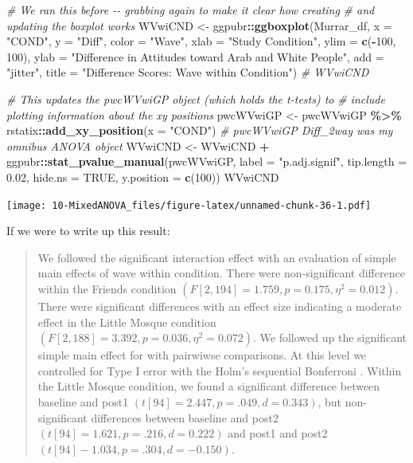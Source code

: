 \documentclass[
  11pt,
]{book}
\newenvironment{Shaded}{\begin{snugshade}}{\end{snugshade}}
\newcommand{\AttributeTok}[1]{\textcolor[rgb]{0.27,0.27,0.27}{#1}}
\newcommand{\CommentTok}[1]{\textcolor[rgb]{0.37,0.37,0.37}{\textit{#1}}}
\newcommand{\ConstantTok}[1]{\textcolor[rgb]{0.37,0.37,0.37}{#1}}
\newcommand{\DecValTok}[1]{\textcolor[rgb]{0.06,0.06,0.06}{#1}}
\newcommand{\FloatTok}[1]{\textcolor[rgb]{0.06,0.06,0.06}{#1}}
\newcommand{\FunctionTok}[1]{\textcolor[rgb]{0.27,0.27,0.27}{\textbf{#1}}}
\newcommand{\NormalTok}[1]{#1}
\newcommand{\OtherTok}[1]{\textcolor[rgb]{0.37,0.37,0.37}{#1}}
\newcommand{\SpecialCharTok}[1]{\textcolor[rgb]{0.43,0.43,0.43}{\textbf{#1}}}
\newcommand{\StringTok}[1]{\textcolor[rgb]{0.5,0.5,0.5}{#1}}
\begin{document}
\begin{Shaded}
\begin{Highlighting}[]
\CommentTok{\# We ran this before {-}{-} grabbing again to make it clear how creating}
\CommentTok{\# and updating the boxplot works}
\NormalTok{WVwiCND }\OtherTok{\textless{}{-}}\NormalTok{ ggpubr}\SpecialCharTok{::}\FunctionTok{ggboxplot}\NormalTok{(Murrar\_df, }\AttributeTok{x =} \StringTok{"COND"}\NormalTok{, }\AttributeTok{y =} \StringTok{"Diff"}\NormalTok{, }\AttributeTok{color =} \StringTok{"Wave"}\NormalTok{,}
    \AttributeTok{xlab =} \StringTok{"Study Condition"}\NormalTok{, }\AttributeTok{ylim =} \FunctionTok{c}\NormalTok{(}\SpecialCharTok{{-}}\DecValTok{100}\NormalTok{, }\DecValTok{100}\NormalTok{), }\AttributeTok{ylab =} \StringTok{"Difference in Attitudes toward Arab and White People"}\NormalTok{,}
    \AttributeTok{add =} \StringTok{"jitter"}\NormalTok{, }\AttributeTok{title =} \StringTok{"Difference Scores: Wave within Condition"}\NormalTok{)}
\CommentTok{\# WVwiCND}

\CommentTok{\# This updates the pwcWVwiGP object (which holds the t{-}tests) to}
\CommentTok{\# include plotting information about the xy positions}
\NormalTok{pwcWVwiGP }\OtherTok{\textless{}{-}}\NormalTok{ pwcWVwiGP }\SpecialCharTok{\%\textgreater{}\%}
\NormalTok{    rstatix}\SpecialCharTok{::}\FunctionTok{add\_xy\_position}\NormalTok{(}\AttributeTok{x =} \StringTok{"COND"}\NormalTok{)}
\CommentTok{\# pwcWVwiGP Diff\_2way was my omnibus ANOVA object}
\NormalTok{WVwiCND }\OtherTok{\textless{}{-}}\NormalTok{ WVwiCND }\SpecialCharTok{+}\NormalTok{ ggpubr}\SpecialCharTok{::}\FunctionTok{stat\_pvalue\_manual}\NormalTok{(pwcWVwiGP, }\AttributeTok{label =} \StringTok{"p.adj.signif"}\NormalTok{,}
    \AttributeTok{tip.length =} \FloatTok{0.02}\NormalTok{, }\AttributeTok{hide.ns =} \ConstantTok{TRUE}\NormalTok{, }\AttributeTok{y.position =} \FunctionTok{c}\NormalTok{(}\DecValTok{100}\NormalTok{))}
\NormalTok{WVwiCND}
\end{Highlighting}
\end{Shaded}

\texttt{[image: 10-MixedANOVA\_files/figure-latex/unnamed-chunk-36-1.pdf]}

If we were to write up this result:

\begin{quote}
We followed the significant interaction effect with an evaluation of simple main effects of wave within condition. There were non-significant difference within the Friends condition \((F [2, 194] = 1.759, p = 0.175, \eta^{2} = 0.012)\). There were significant differences with an effect size indicating a moderate effect in the Little Mosque condition \((F[2, 188] = 3.392, p = 0.036, \eta^{2} = 0.072)\). We followed up the significant simple main effect for with pairwiwse comparisons. At this level we controlled for Type I error with the Holm's sequential Bonferroni \citep{green_using_2017}. Within the Little Mosque condition, we found a significant difference between baseline and post1 \((t[94] = 2.447, p = .049, d = 0.343)\), but non-significant differences between baseline and post2 \((t[94] = 1.621, p = .216, d = 0.222)\) and post1 and post2 \((t[94] -1.034, p = .304, d = -0.150)\).
\end{quote}
\end{document}

